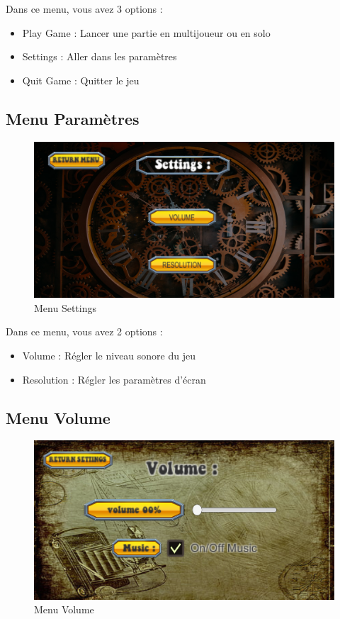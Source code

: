 \documentclass[a4paper, 11pt]{article}
\begin{document}
	\noindent Dans ce menu, vous avez 3 options :
	\begin{itemize}
		\item Play Game : Lancer une partie en multijoueur ou en solo
		\item Settings : Aller dans les paramètres
		\item Quit Game : Quitter le jeu
	\end{itemize}
	
	\subsection{Menu Paramètres}
	\begin{figure}[!ht]
		\centering
		\includegraphics[scale=0.3]{images/settings.png}
		\caption{Menu Settings}
	\end{figure}
	
	\noindent Dans ce menu, vous avez 2 options :
	\begin{itemize}
		\item Volume : Régler le niveau sonore du jeu
		\item Resolution : Régler les paramètres d'écran
	\end{itemize}
	

	\subsection{Menu Volume}
	\begin{figure}[!ht]
		\centering
		\includegraphics[scale=0.3]{images/volume.png}
		\caption{Menu Volume}
	\end{figure}
	
\end{document}
